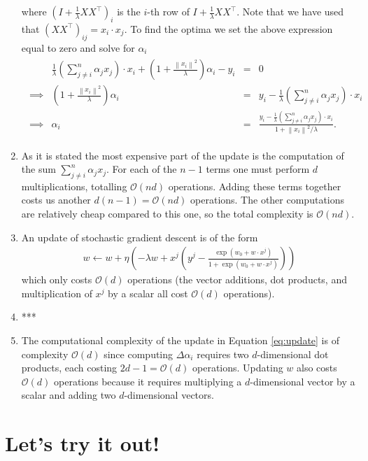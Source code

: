 \documentclass{article}
\newcommand{\norm}[1]{\left\|#1\right\|}
\begin{document}
\begin{enumerate}
	where $(I+\tfrac1\lambda XX^\top)_i$ is the $i$-th row of $I+\tfrac1\lambda XX^\top$. Note that we have used that $(XX^\top)_{ij} = x_i\cdot x_j$. To find the optima we set the above expression equal to zero and solve for $\alpha_i$
	\begin{align}
		\begin{array}{crcl}
			 &\tfrac1\lambda\left(\sum_{j\neq i}^n \alpha_jx_j\right)\cdot x_i + \left(1+\frac{\norm{x_i}^2}{\lambda} \right)\alpha_i-y_i & = & 0\\
			\implies & \left(1+\frac{\norm{x_i}^2}{\lambda} \right)\alpha_i & = & y_i - \tfrac1\lambda\left(\sum_{j\neq i}^n \alpha_jx_j\right)\cdot x_i \\
			\implies & \alpha_i & = & \frac{y_i - \tfrac1\lambda\left(\sum_{j\neq i}^n \alpha_jx_j\right)\cdot x_i}{1+\norm{x_i}^2/\lambda}.
		\end{array}
	\end{align}
	\item As it is stated the most expensive part of the update is the computation of the sum $\sum_{j\neq i}^n \alpha_jx_j$. For each of the $n-1$ terms one must perform $d$ multiplications, totalling $\mathcal{O}(nd)$ operations. Adding these terms together costs us another $d(n-1)=\mathcal{O}(nd)$ operations. The other computations are relatively cheap compared to this one, so the total complexity is $\mathcal{O}(nd)$.
	\item An update of stochastic gradient descent is of the form
	\begin{align}
		w\leftarrow w + \eta\left(-\lambda w + x^j\left(y^j-\frac{\exp(w_0+w\cdot x^j)}{1+\exp(w_0+w\cdot x^j)} \right)\right)
	\end{align}
	which only costs $\mathcal{O}(d)$ operations (the vector additions, dot products, and multiplication of $x^j$ by a scalar all cost $\mathcal{O}(d)$ operations).
	\item ***
	\item The computational complexity of the update in Equation \eqref{eq:update} is of complexity $\mathcal{O}(d)$ since computing $\Delta \alpha_i$ requires two $d$-dimensional dot products, each costing $2d-1=\mathcal{O}(d)$ operations. Updating $w$ also costs $\mathcal{O}(d)$ operations because it requires multiplying a $d$-dimensional vector by a scalar and adding two $d$-dimensional vectors.
\end{enumerate}


\section{Let's try it out!}
\end{document}

